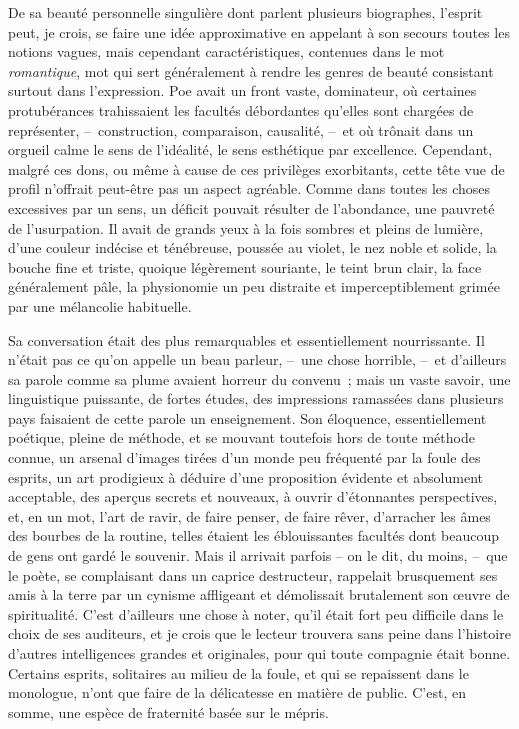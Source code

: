 \documentclass[french,twoside]{book} %
\begin{document}
De sa beauté personnelle singulière dont parlent plusieurs biographes, l’esprit peut, je crois, se faire une idée approximative en appelant à son secours toutes les notions vagues, mais cependant caractéristiques, contenues dans le mot \emph{romantique}, mot qui sert généralement à rendre les genres de beauté consistant surtout dans l’expression. Poe avait un front vaste, dominateur, où certaines protubérances trahissaient les facultés débordantes qu’elles sont chargées de représenter, – construction, comparaison, causalité, – et où trônait dans un orgueil calme le sens de l’idéalité, le sens esthétique par excellence. Cependant, malgré ces dons, ou même à cause de ces privilèges exorbitants, cette tête vue de profil n’offrait peut-être pas un aspect agréable. Comme dans toutes les choses excessives par un sens, un déficit pouvait résulter de l’abondance, une pauvreté de l’usurpation. Il avait de grands yeux à la fois sombres et pleins de lumière, d’une couleur indécise et ténébreuse, poussée au violet, le nez noble et solide, la bouche fine et triste, quoique légèrement souriante, le teint brun clair, la face généralement pâle, la physionomie un peu distraite et imperceptiblement grimée par une mélancolie habituelle.\par
Sa conversation était des plus remarquables et essentiellement nourrissante. Il n’était pas ce qu’on appelle un beau parleur, – une chose horrible, – et d’ailleurs sa parole comme sa plume avaient horreur du convenu ; mais un vaste savoir, une linguistique puissante, de fortes études, des impressions ramassées dans plusieurs pays faisaient de cette parole un enseignement. Son éloquence, essentiellement poétique, pleine de méthode, et se mouvant toutefois hors de toute méthode connue, un arsenal d’images tirées d’un monde peu fréquenté par la foule des esprits, un art prodigieux à déduire d’une proposition évidente et absolument acceptable, des aperçus secrets et nouveaux, à ouvrir d’étonnantes perspectives, et, en un mot, l’art de ravir, de faire penser, de faire rêver, d’arracher les âmes des bourbes de la routine, telles étaient les éblouissantes facultés dont beaucoup de gens ont gardé le souvenir. Mais il arrivait parfois – on le dit, du moins, – que le poète, se complaisant dans un caprice destructeur, rappelait brusquement ses amis à la terre par un cynisme affligeant et démolissait brutalement son œuvre de spiritualité. C’est d’ailleurs une chose à noter, qu’il était fort peu difficile dans le choix de ses auditeurs, et je crois que le lecteur trouvera sans peine dans l’histoire d’autres intelligences grandes et originales, pour qui toute compagnie était bonne. Certains esprits, solitaires au milieu de la foule, et qui se repaissent dans le monologue, n’ont que faire de la délicatesse en matière de public. C’est, en somme, une espèce de fraternité basée sur le mépris.\par
\end{document}
